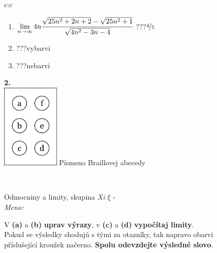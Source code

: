 \documentclass[10pt]{report}
\begin{document}
\begin{tabular}{c:c}
\begin{minipage}[c][104.5mm][t]{0.5\linewidth}
\begin{center}
\begin{minipage}{0.79\linewidth}
\begin{center}
\begin{varwidth}{\linewidth}
\begin{enumerate}
\item $\lim\limits_{n\to\infty}4n\cfrac{\sqrt{25n^2+2n+2}-\sqrt{25n^2+1}}{\sqrt{4n^2-3n-4}}$\quad \dotfill\; ???\;\dotfill \quad $\nicefrac{4}{5}$
\item \quad \dotfill\; ???\;\dotfill \quad vybarvi
\item \quad \dotfill\; ???\;\dotfill \quad nebarvi
\end{enumerate}
\end{varwidth}
\end{center}
\end{minipage}
\begin{minipage}{0.20\linewidth}
\begin{center}
{\Huge\bfseries 2.} \\[2mm]
\includegraphics[height=40mm]{../images/braille.png}
{\small Písmeno Braillovej abecedy}
\end{center}
\end{minipage}
\end{center}
\end{minipage}
\\ \hdashline
\begin{minipage}[c][104.5mm][t]{0.5\linewidth}
\begin{center}
\vspace{7mm}
{\huge Odmocniny a limity, skupina \textit{Xi $\xi$} -}\\[5mm]
\textit{Meno:}\phantom{xxxxxxxxxxxxxxxxxxxxxxxxxxxxxxxxxxxxxxxxxxxxxxxxxxxxxxxxxxxxxxxxx}\\[5mm]
\begin{minipage}{0.95\linewidth}
\begin{center}
V \textbf{(a)} a \textbf{(b)} \textbf{uprav výrazy}, v \textbf{(c)} a \textbf{(d)} \textbf{vypočítaj limity}.\\Pokud se výsledky shodujú s tými za otazníky, tak napravo obarvi\\příslušející kroužek načerno. \textbf{Spolu odevzdejte výsledné slovo}.
\end{center}
\end{minipage}
\\[1mm]

\end{center}
\end{minipage}
\end{tabular}
\end{document}
